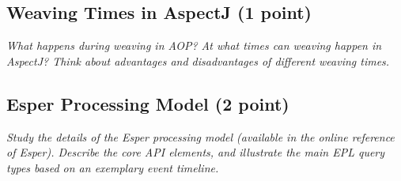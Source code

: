 \documentclass[a4paper,10pt]{article}
\begin{document}
\subsection{Weaving Times in AspectJ (1 point)}

\emph{What happens during weaving in AOP? At what times can weaving happen in AspectJ? Think about
advantages and disadvantages of different weaving times.}

\vspace{3mm}

\subsection{Esper Processing Model (2 point)}

\emph{Study the details of the Esper processing model (available in the online reference of Esper). Describe the
core API elements, and illustrate the main EPL query types based on an exemplary event timeline.}

\vspace{3mm}
\end{document}
